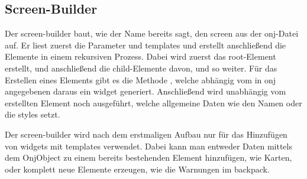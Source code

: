 
\renewcommand{\kapitelautor}{Autor: Felix Zwickelstorfer}
\subsection{Screen-Builder}\label{sec:screen-builder}
\renewcommand{\kapitelautor}{Autor: Felix Zwickelstorfer}
Der screen-builder baut, wie der Name bereits sagt, den screen aus der onj-Datei auf.
Er liest zuerst die Parameter und templates und erstellt anschließend die Elemente in einem rekursiven Prozess.
Dabei wird zuerst das root-Element erstellt, und anschließend die child-Elemente davon, und so weiter.
Für das Erstellen eines Elements gibt es die Methode , welche abhängig vom in onj angegebenen  daraus ein widget generiert.
Anschließend wird unabhängig vom erstellten Element noch  ausgeführt, welche allgemeine Daten wie \zB den Namen oder die styles setzt.

Der screen-builder wird nach dem erstmaligen Aufbau nur für das Hinzufügen von widgets mit templates verwendet.
Dabei kann man entweder Daten mittels dem  OnjObject zu einem bereits bestehenden Element hinzufügen, wie \zB Karten, oder komplett neue Elemente erzeugen, wie die Warnungen im backpack.
